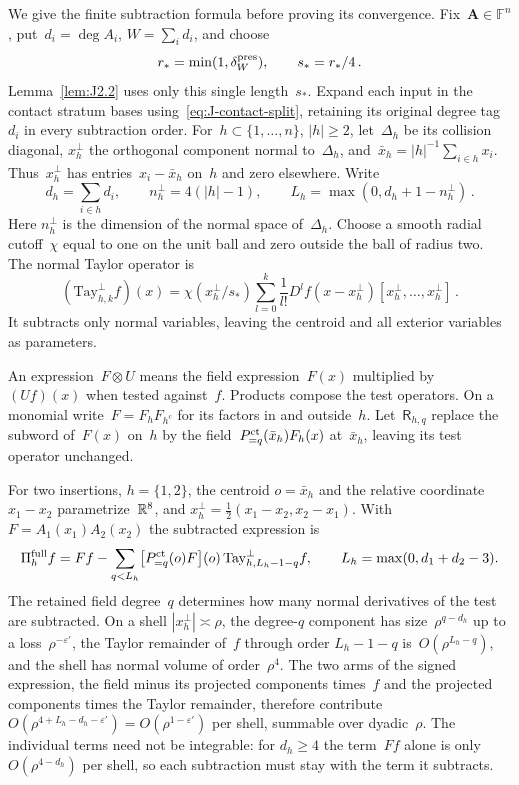 We give the finite subtraction formula before proving its convergence. Fix~$\boldsymbol A\in\mathbb F^n$, put~$d_i=\deg A_i$, $W=\sum_id_i$, and choose
\begin{equation*}
r_* =\min(1,\delta_W^{\rm pres}),\qquad s_*=r_*/4\,.
\end{equation*}
Lemma~\ref{lem:J2.2} uses only this single length~$s_*$. Expand each input in the contact stratum bases using~\eqref{eq:J-contact-split}, retaining its original degree tag~$d_i$ in every subtraction order. For~$h\subset\{1,\ldots,n\}$, $|h|\ge2$, let~$\Delta_h$ be its collision diagonal, $x_h^\perp$ the orthogonal component normal to~$\Delta_h$, and~$\bar x_h=|h|^{-1}\sum_{i\in h}x_i$. Thus~$x_h^\perp$ has entries~$x_i-\bar x_h$ on~$h$ and zero elsewhere. Write
\begin{equation*}
d_h=\sum_{i\in h}d_i,\qquad n^\perp_h=4(|h|-1),\qquad L_h=\max(0,d_h+1-n^\perp_h)\,.
\end{equation*}
Here $n^\perp_h$ is the dimension of the normal space of~$\Delta_h$. Choose a smooth radial cutoff~$\chi$ equal to one on the unit ball and zero outside the ball of radius two. The normal Taylor operator is
\begin{equation}\label{eq:J-normal-Taylor}
(\mathrm{Tay}_{h,k}^{\perp}f)(x)=\chi(x_h^\perp/s_*)
\sum_{l=0}^k\frac1{l!}D^lf(x-x_h^\perp)[x_h^\perp,\ldots,x_h^\perp]\,.
\end{equation}
It subtracts only normal variables, leaving the centroid and all exterior variables as parameters.

An expression~$F\otimes U$ means the field expression~$F(x)$ multiplied by~$(Uf)(x)$ when tested against~$f$. Products compose the test operators. On a monomial write~$F=F_hF_{h^c}$ for its factors in and outside~$h$. Let~$\mathsf R_{h,q}$ replace the subword of~$F(x)$ on~$h$ by the field~$P_{=q}^{\rm ct}(\bar x_h)F_h(x)$ at~$\bar x_h$, leaving its test operator unchanged.

For two insertions, $h=\{1,2\}$, the centroid $o=\bar x_h$ and the relative coordinate $x_1-x_2$ parametrize~$\mathbb{R}^8$, and $x_h^\perp=\tfrac12(x_1-x_2,x_2-x_1)$. With $F=A_1(x_1)A_2(x_2)$ the subtracted expression is
\begin{equation*}
\Pi_h^{\rm full}f
=Ff-\sum_{q<L_h}
\bigl[P_{=q}^{\rm ct}(o)F\bigr](o)\,
\mathrm{Tay}_{h,L_h-1-q}^{\perp}f,\qquad L_h=\max(0,d_1+d_2-3).
\end{equation*}
The retained field degree~$q$ determines how many normal derivatives of the test are subtracted. On a shell $|x_h^\perp|\asymp\rho$, the degree-$q$ component has size~$\rho^{q-d_h}$ up to a loss~$\rho^{-\varepsilon'}$, the Taylor remainder of~$f$ through order $L_h-1-q$ is~$O(\rho^{L_h-q})$, and the shell has normal volume of order~$\rho^{4}$. The two arms of the signed expression, the field minus its projected components times~$f$ and the projected components times the Taylor remainder, therefore contribute $O(\rho^{4+L_h-d_h-\varepsilon'})=O(\rho^{1-\varepsilon'})$ per shell, summable over dyadic~$\rho$. The individual terms need not be integrable: for $d_h\ge4$ the term~$Ff$ alone is only $O(\rho^{4-d_h})$ per shell, so each subtraction must stay with the term it subtracts.

